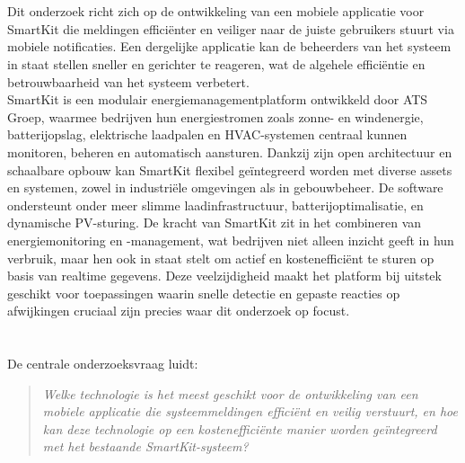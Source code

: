 \section{}%
\label{sec:probleemstelling}

\noindent
Dit onderzoek richt zich op de ontwikkeling van een mobiele applicatie voor SmartKit die meldingen efficiënter en veiliger naar de juiste gebruikers stuurt via mobiele notificaties. Een dergelijke applicatie kan de beheerders van het systeem in staat stellen sneller en gerichter te reageren, wat de algehele efficiëntie en betrouwbaarheid van het systeem verbetert.\\

SmartKit is een modulair energiemanagementplatform ontwikkeld door ATS Groep, waarmee bedrijven hun energiestromen zoals zonne- en windenergie, batterijopslag, elektrische laadpalen en HVAC-systemen centraal kunnen monitoren, beheren en automatisch aansturen. Dankzij zijn open architectuur en schaalbare opbouw kan SmartKit flexibel geïntegreerd worden met diverse assets en systemen, zowel in industriële omgevingen als in gebouwbeheer. De software ondersteunt onder meer slimme laadinfrastructuur, batterijoptimalisatie, en dynamische PV-sturing. De kracht van SmartKit zit in het combineren van energiemonitoring en -management, wat bedrijven niet alleen inzicht geeft in hun verbruik, maar hen ook in staat stelt om actief en kostenefficiënt te sturen op basis van realtime gegevens. Deze veelzijdigheid maakt het platform bij uitstek geschikt voor toepassingen waarin snelle detectie en gepaste reacties op afwijkingen cruciaal zijn precies waar dit onderzoek op focust.\\


\section{}%
\label{sec:onderzoeksvraag}

\noindent De centrale onderzoeksvraag luidt:

\begin{quote} 
    \textit{Welke technologie is het meest geschikt voor de ontwikkeling van een mobiele applicatie die systeemmeldingen efficiënt en veilig verstuurt, en hoe kan deze technologie op een kostenefficiënte manier worden geïntegreerd met het bestaande SmartKit-systeem?} 
\end{quote}

